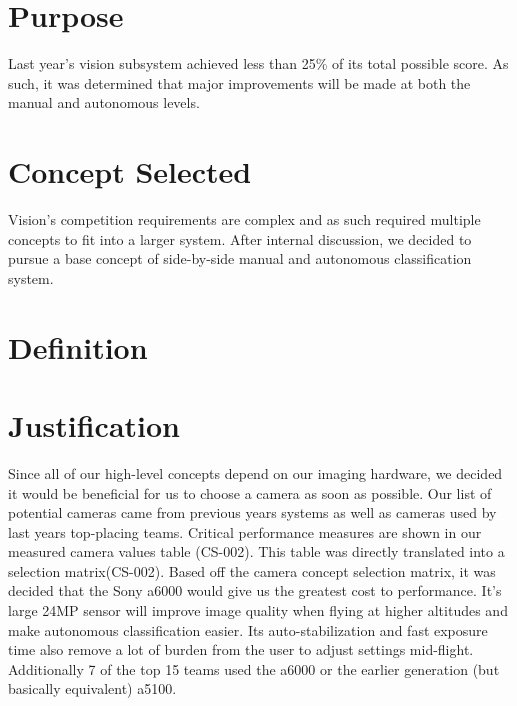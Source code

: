 \documentclass[]{auvsi_doc}
\begin{document}
\begin{AUVSITitlePage}
\begin{artifacttable}
\end{artifacttable}
\end{AUVSITitlePage}

\section{Purpose}

Last year's vision subsystem achieved less than 25\% of its total possible score. As such, it was determined that major improvements will be made at both the manual and autonomous levels.

\section{Concept Selected}

Vision's competition requirements are complex and as such required multiple concepts to fit into a larger system. After internal discussion, we decided to pursue a base concept of side-by-side manual and autonomous classification system.

\section{Definition}

\section{Justification}

Since all of our high-level concepts depend on our imaging hardware, we decided it would be beneficial for us to choose a camera as soon as possible. Our list of potential cameras came from previous years systems as well as cameras used by last years top-placing teams. Critical performance measures are shown in our measured camera values table (CS-002). This table was directly translated into a selection matrix(CS-002). Based off the camera concept selection matrix, it was decided that the Sony a6000 would give us the greatest cost to performance. It's large 24MP sensor will improve image quality when flying at higher altitudes and make autonomous classification easier. Its auto-stabilization and fast exposure time also remove a lot of burden from the user to adjust settings mid-flight. Additionally 7 of the top 15 teams used the a6000 or the earlier generation (but basically equivalent) a5100.
\end{document}
